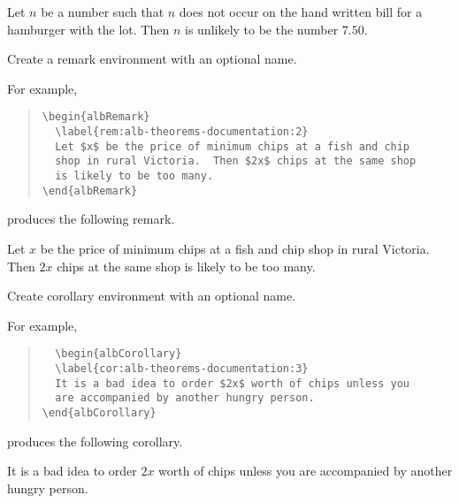 \documentclass[11pt,a4paper,oneside,titlepage]{alb-latex}
\begin{document}
\begin{description}
  \begin{albLemma}
    \label{lem:alb-theorems-documentation:1}
    Let $n$ be a number such that $n$ does not occur on the hand written
    bill for a hamburger with the lot.  Then $n$ is unlikely to be the
    number $7.50$.
  \end{albLemma}

\item[\albLtxEnv{albRemark}\albLtxOpt{name}] Create a remark environment
  with an optional name.

  For example,
  \begin{quote}
\begin{verbatim}
\begin{albRemark}
  \label{rem:alb-theorems-documentation:2}
  Let $x$ be the price of minimum chips at a fish and chip
  shop in rural Victoria.  Then $2x$ chips at the same shop
  is likely to be too many.
\end{albRemark}
\end{verbatim}
  \end{quote}
  produces the following remark.

  \begin{albRemark}
    \label{rem:alb-theorems-documentation:2}
    Let $x$ be the price of minimum chips at a fish and chip shop in
    rural Victoria.  Then $2x$ chips at the same shop is likely to be
    too many.
  \end{albRemark}

\item[\albLtxEnv{albCorollary}\albLtxOpt{name}] Create corollary
  environment with an optional name.

  For example,
  \begin{quote}
\begin{verbatim}
  \begin{albCorollary}
  \label{cor:alb-theorems-documentation:3}
  It is a bad idea to order $2x$ worth of chips unless you
  are accompanied by another hungry person.
\end{albCorollary}
\end{verbatim}
  \end{quote}
  produces the following corollary.

  \begin{albCorollary}
    \label{cor:alb-theorems-documentation:3}
    It is a bad idea to order $2x$ worth of chips unless you are
    accompanied by another hungry person.
  \end{albCorollary}
\end{description}
\end{document}
